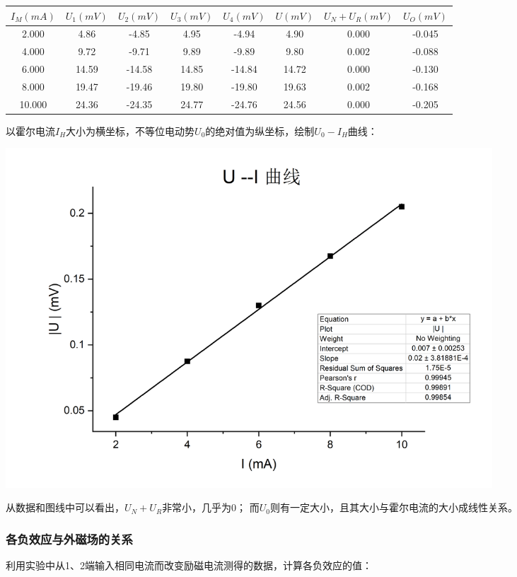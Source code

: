 \documentclass{article}
\begin{document}
        \begin{center}
        \begin{tabular}{|c||c|c|c|c||c|c|c|}
            \hline
            $I_M(mA)$ & $U_1(mV)$ & $U_2(mV)$ & $U_3(mV)$ & $U_4(mV)$ & $U(mV)$ & $U_N+U_R(mV)$ & $U_O(mV)$ \\
            \hline
            2.000 & 4.86 & -4.85 & 4.95 & -4.94 & 4.90 & 0.000 & -0.045\\
            \hline
            4.000 & 9.72 & -9.71 & 9.89 & -9.89 & 9.80 & 0.002 & -0.088\\
            \hline
            6.000 & 14.59 & -14.58 & 14.85 & -14.84 & 14.72 & 0.000 & -0.130\\
            \hline
            8.000 &  19.47 & -19.46 & 19.80 & -19.80 & 19.63 & 0.002 & -0.168\\
            \hline
            10.000 & 24.36 & -24.35 & 24.77 & -24.76 & 24.56 & 0.000 & -0.205\\
            \hline
        \end{tabular}        
    \end{center}

    以霍尔电流$I_H$大小为横坐标，不等位电动势$U_0$的绝对值为纵坐标，绘制$U_0-I_H$曲线：

    \begin{center}
        \includegraphics[width=0.8\textwidth]{U0-I curve.jpg}
    \end{center}

    从数据和图线中可以看出，$U_N+U_R$非常小，几乎为0；
    而$U_0$则有一定大小，且其大小与霍尔电流的大小成线性关系。

    \subsubsection{各负效应与外磁场的关系}
    利用实验中从1、2端输入相同电流而改变励磁电流测得的数据，计算各负效应的值：
\end{document}

